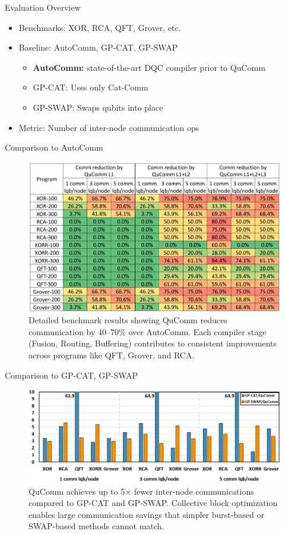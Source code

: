 \documentclass{beamer}
\begin{document}
	\begin{frame}{Evaluation Overview}
		\begin{itemize}
			\item Benchmarks: XOR, RCA, QFT, Grover, etc.
			\item Baseline: AutoComm, GP-CAT, GP-SWAP
			\begin{itemize}
				\item \textbf{AutoComm:} state-of-the-art DQC compiler prior to QuComm
				\item GP-CAT: Uses only Cat-Comm
				\item GP-SWAP: Swaps qubits into place
			\end{itemize}
			\item Metric: Number of inter-node communication ops
		\end{itemize}
	\end{frame}
	
	\begin{frame}{Comparison to AutoComm}
		\begin{figure}
			\includegraphics[width=.8\textwidth]{figure/main.png}
			\caption[]{Detailed benchmark results showing QuComm reduces communication by 40–70\% over AutoComm. Each compiler stage (Fusion, Routing, Buffering) contributes to consistent improvements across programs like QFT, Grover, and RCA.}
		\end{figure}
	\end{frame}
	
	\begin{frame}{Comparison to GP-CAT, GP-SWAP}
		\begin{figure}
			\includegraphics[width=.8\textwidth]{figure/other.png}
			\caption[]{QuComm achieves up to 5× fewer inter-node communications compared to GP-CAT and GP-SWAP. Collective block optimization enables large communication savings that simpler burst-based or SWAP-based methods cannot match.}
		\end{figure}
	\end{frame}
	
\end{document}
